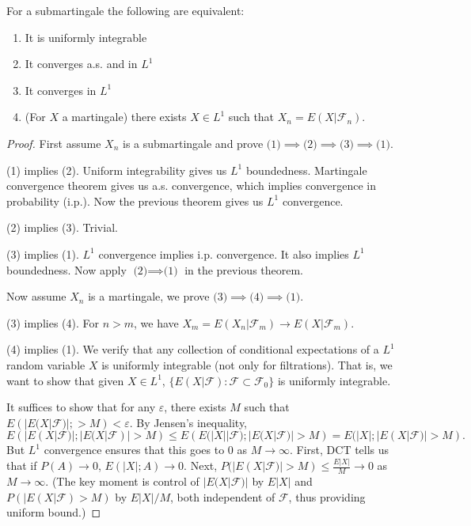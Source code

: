 \begin{theorem}
	For a submartingale the following are equivalent:
	\begin{enumerate}
		\item It is uniformly integrable
		\item It converges a.s. and in $L^1$
		\item It converges in $L^1$ 
		\item (For $X$ a martingale) there exists $X \in L^1$ such that $X_n = E(X | \mathcal{F}_n)$.
	\end{enumerate}
\end{theorem}
\begin{proof}
	First assume $X_n$ is a submartingale and prove $\text{(1)} \implies \text{(2)} \implies \text{(3)} \implies \text{(1)}$.

	(1) implies (2). Uniform integrability gives us $L^1 $ boundedness. Martingale convergence theorem gives us a.s. convergence, which implies convergence in probability (i.p.). Now the previous theorem gives us $L^1$ convergence.

	(2) implies (3). Trivial.

	(3) implies (1). $L^1$ convergence implies i.p. convergence.  It also implies $L^1$ boundedness. Now apply $\text{(2)}\implies\text{(1)}$ in the previous theorem.

	Now assume $X_n$ is a martingale, we prove $\text{(3)}\implies \text{(4)} \implies \text{(1)}$.

	(3) implies (4). For $n > m$, we have $X_m = E\left( X_n | \mathcal{F}_m \right)  \to  E\left( X | \mathcal{F}_m \right) $.

	(4) implies (1). We verify that any collection of conditional expectations of a $L^1$ random variable $X$ is uniformly integrable (not only for filtrations). That is, we want to show that given $X \in L^1$, $\{E(X | \mathcal{F}): \mathcal{F} \subset \mathcal{F}_0\} $ is uniformly integrable.

	It suffices to show that for any $\varepsilon$, there exists $M$ such that $E\left(|E(X | \mathcal{F})| ; > M\right) < \varepsilon$. By Jensen's inequality,
	\[
		E\left( |E(X|\mathcal{F})|;|E(X|\mathcal{F})|>M \right) 
		\le E\left( E(|X| |\mathcal{F}); |E(X|\mathcal{F})|>M \right) 
		= E(|X| ; |E(X|\mathcal{F})|> M)
	.\] 
	But $L^1$ convergence ensures that this goes to $0$ as $M \to  \infty $. First, DCT tells us that if $P(A) \to  0$, $E(|X|; A) \to 0$. Next, $P(|E(X | \mathcal{F})| > M) \le \frac{E|X|}{M} \to 0$ as $M \to  \infty $. 
	(The key moment is control of $|E(X|\mathcal{F})|$ by $E|X|$ and $P(|E(X|\mathcal{F})>M)$ by $E|X|/M$, both independent of $\mathcal{F}$, thus providing uniform bound.)
\end{proof}



